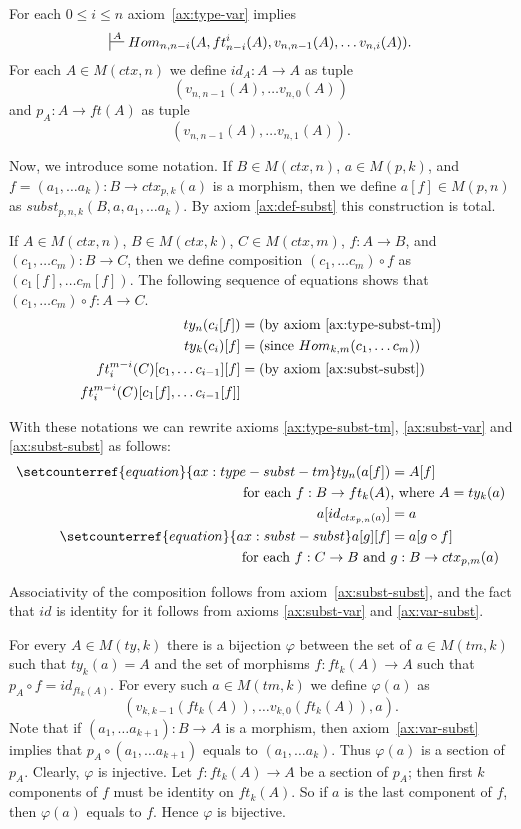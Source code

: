 \documentclass[reqno]{amsart}
\theoremstyle{definition}
\theoremstyle{remark}
\numberwithin{figure}{section}
\begin{document}
For each $0 \leq i \leq n$ axiom~\eqref{ax:type-var} implies
\[ \sststile{}{A} Hom_{n,n-i}(A, ft^i_{n-i}(A), v_{n,n-1}(A), \ldots v_{n,i}(A)). \]
For each $A \in M(ctx,n)$ we define $id_A : A \to A$ as tuple
\[ (v_{n,n-1}(A), \ldots v_{n,0}(A)) \]
and $p_A : A \to ft(A)$ as tuple
\[ (v_{n,n-1}(A), \ldots v_{n,1}(A)). \]

Now, we introduce some notation.
If $B \in M(ctx,n)$, $a \in M(p,k)$, and $f = (a_1, \ldots a_k) : B \to ctx_{p,k}(a)$ is a morphism, then we define $a[f] \in M(p,n)$ as $subst_{p,n,k}(B, a, a_1, \ldots a_k)$.
By axiom \eqref{ax:def-subst} this construction is total.

If $A \in M(ctx,n)$, $B \in M(ctx,k)$, $C \in M(ctx,m)$, $f : A \to B$, and $(c_1, \ldots c_m) : B \to C$,
    then we define composition $(c_1, \ldots c_m) \circ f$ as $(c_1[f], \ldots c_m[f])$.
The following sequence of equations shows that $(c_1, \ldots c_m) \circ f : A \to C$.
\begin{align*}
ty_n(c_i[f]) & = \text{(by axiom~\eqref{ax:type-subst-tm})} \\
ty_k(c_i)[f] & = \text{(since $Hom_{k,m}(c_1, \ldots c_m)$)} \\
ft^{m-i}_i(C)[c_1, \ldots c_{i-1}][f] & = \text{(by axiom~\eqref{ax:subst-subst})} \\
ft^{m-i}_i(C)[c_1[f], \ldots c_{i-1}[f]] &
\end{align*}

With these notations we can rewrite axioms \eqref{ax:type-subst-tm}, \eqref{ax:subst-var} and \eqref{ax:subst-subst} as follows:
\begin{align}
\setcounterref{equation}{ax:type-subst-tm}
\addtocounter{equation}{-1}
ty_n(a[f]) & = A[f] \\ \notag
\text{ for each } f : B \to ft_k(A) & \text{, where } A = ty_k(a) \\
a[id_{ctx_{p,n}(a)}] & = a \\
\setcounterref{equation}{ax:subst-subst}
\addtocounter{equation}{-1}
a[g][f] & = a[g \circ f] \\ \notag
\text{ for each } f : C \to B \text{ and } & g : B \to ctx_{p,m}(a)
\end{align}

Associativity of the composition follows from axiom~\eqref{ax:subst-subst}, and the fact that $id$ is identity for it follows from axioms \eqref{ax:subst-var} and \eqref{ax:var-subst}.

For every $A \in M(ty,k)$ there is a bijection $\varphi$ between the set of $a \in M(tm,k)$ such that $ty_k(a) = A$
    and the set of morphisms $f : ft_k(A) \to A$ such that $p_A \circ f = id_{ft_k(A)}$.
For every such $a \in M(tm,k)$ we define $\varphi(a)$ as
\[ (v_{k,k-1}(ft_k(A)), \ldots v_{k,0}(ft_k(A)), a). \]
Note that if $(a_1, \ldots a_{k+1}) : B \to A$ is a morphism, then axiom~\eqref{ax:var-subst} implies that $p_A \circ (a_1, \ldots a_{k+1})$ equals to $(a_1, \ldots a_k)$.
Thus $\varphi(a)$ is a section of $p_A$.
Clearly, $\varphi$ is injective.
Let $f : ft_k(A) \to A$ be a section of $p_A$; then first $k$ components of $f$ must be identity on $ft_k(A)$.
So if $a$ is the last component of $f$, then $\varphi(a)$ equals to $f$.
Hence $\varphi$ is bijective.
\end{document}
